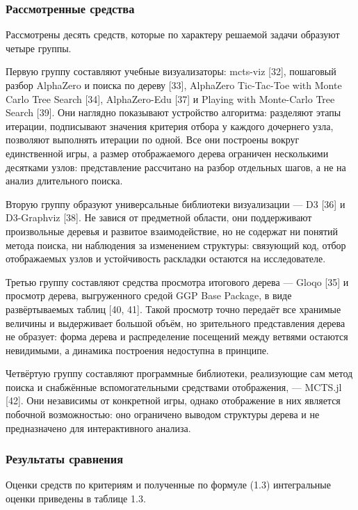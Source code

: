 \subsubsection{Рассмотренные средства}

Рассмотрены десять средств, которые по характеру решаемой задачи образуют четыре группы.

Первую группу составляют учебные визуализаторы: mcts-viz [32], пошаговый разбор AlphaZero и поиска по дереву [33], AlphaZero Tic-Tac-Toe with Monte Carlo Tree Search [34], AlphaZero-Edu [37] и Playing with Monte-Carlo Tree Search [39]. Они наглядно показывают устройство алгоритма: разделяют этапы итерации, подписывают значения критерия отбора у каждого дочернего узла, позволяют выполнять итерации по одной. Все они построены вокруг единственной игры, а размер отображаемого дерева ограничен несколькими десятками узлов: представление рассчитано на разбор отдельных шагов, а не на анализ длительного поиска.

Вторую группу образуют универсальные библиотеки визуализации — D3 [36] и D3-Graphviz [38]. Не завися от предметной области, они поддерживают произвольные деревья и развитое взаимодействие, но не содержат ни понятий метода поиска, ни наблюдения за изменением структуры: связующий код, отбор отображаемых узлов и устойчивость раскладки остаются на исследователе.

Третью группу составляют средства просмотра итогового дерева — Gloqo [35] и просмотр дерева, выгруженного средой GGP Base Package, в виде развёртываемых таблиц [40, 41]. Такой просмотр точно передаёт все хранимые величины и выдерживает большой объём, но зрительного представления дерева не образует: форма дерева и распределение посещений между ветвями остаются невидимыми, а динамика построения недоступна в принципе.

Четвёртую группу составляют программные библиотеки, реализующие сам метод поиска и снабжённые вспомогательными средствами отображения, — MCTS.jl [42]. Они независимы от конкретной игры, однако отображение в них является побочной возможностью: оно ограничено выводом структуры дерева и не предназначено для интерактивного анализа.

\subsubsection{Результаты сравнения}

Оценки средств по критериям и полученные по формуле (1.3) интегральные оценки приведены в таблице 1.3.


